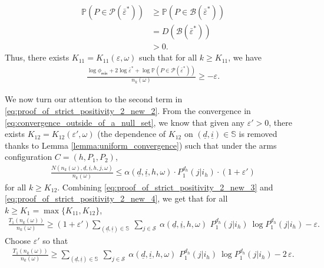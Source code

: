 \begin{itemize}
{ \begin{align}
 	\mathbb{P}(P\in \mathscr{P}(\bar{\varepsilon}^*)) &\geq \mathbb{P}(P\in \mathscr{B}(\bar{\varepsilon}^*))
 	\nonumber\\
 	&=D(\mathscr{B}(\bar{\varepsilon}^*))\nonumber\\
 	&>0.
 \end{align}
 Thus, there exists $K_{11}=K_{11}(\varepsilon, \omega)$ such that for all $k\geq K_{11}$, we have
 \begin{align}
 	\frac{\log \phi_{\textsf{min}}+2\log \bar{\varepsilon}^*+\log \mathbb{P}(P\in \mathscr{P}(\bar{\varepsilon}^*))}{n_k(\omega)}\geq -\varepsilon.
 	\label{eq:proof_of_strict_positivity_2_new_3}
 \end{align}
 
 We now turn our attention to the second term in \eqref{eq:proof_of_strict_positivity_2_new_2}. From the convergence in \eqref{eq:convergence_outside_of_a_null_set}, we know that given any $\varepsilon'>0$, there exists $K_{12}=K_{12}(\varepsilon', \omega)$ (the dependence of $K_{12}$ on $(\underline{d}, \underline{i})\in \mathbb{S}$ is removed thanks to Lemma \ref{lemma:uniform_convergence}) such that under the arms configuration $C=(h, P_1, P_2)$,
 \begin{align}
 	\frac{N(n_k(\omega), \underline{d}, \underline{i}, h, j, \omega)}{n_k(\omega)}\leq \alpha(\underline{d}, \underline{i}, h, \omega)\cdot P_1^{d_h}(j|i_h)\cdot (1+\varepsilon')
 	\label{eq:proof_of_strict_positivity_2_new_4}
 \end{align}
 for all $k\geq K_{12}$. Combining \eqref{eq:proof_of_strict_positivity_2_new_3} and \eqref{eq:proof_of_strict_positivity_2_new_4}, we get that for all $k\geq K_1=\max\{K_{11}, K_{12}\}$, 
\begin{align}
	\frac{T_1(n_k(\omega))}{n_k(\omega)} \geq (1+\varepsilon') \sum\limits_{(\underline{d}, \underline{i})\in \mathbb{S}}~\sum\limits_{j\in\mathcal{S}}~ \alpha(\underline{d}, \underline{i}, h, \omega)\,\, P_1^{d_h}(j|i_h) ~\log P_1^{d_h}(j|i_h) - \varepsilon.
	\label{eq:proof_of_strict_positivity_2_new_5}
\end{align}
Choose $\varepsilon'$ so that
\begin{align}
	\frac{T_1(n_k(\omega))}{n_k(\omega)} \geq  \sum\limits_{(\underline{d}, \underline{i})\in \mathbb{S}}~\sum\limits_{j\in\mathcal{S}}~ \alpha(\underline{d}, \underline{i}, h, \omega)\,\, P_1^{d_h}(j|i_h) ~\log P_1^{d_h}(j|i_h) - 2\,\varepsilon.
	\label{eq:liminf_T_1(n)/n_final}
\end{align}

}
\end{itemize}
